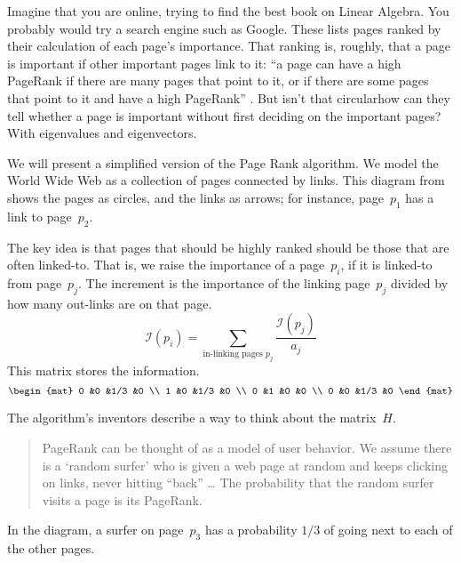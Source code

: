 
Imagine that you are online, trying to find the best book
on Linear Algebra.
You probably would try a search engine such as Google.
These lists pages ranked by their calculation of each 
page's importance.
That ranking is, roughly, that a page is important if other important
pages link to it: 
``a page can have a high PageRank if there are many pages that point
to it, or if there are some pages that point to it and have a high PageRank''
\cite{BrinPage}.
But isn't that circular\Dash how can they tell whether a page is
important without first deciding on the important pages?
With eigenvalues and eigenvectors.

We will present a simplified version of the Page Rank algorithm. 
We model the World Wide Web as a collection of pages connected by
links.
This diagram from \cite{Wills}
shows the pages as circles, and the links as arrows;
for instance, page~$p_1$ has a link to page~$p_2$. 

The key idea is that pages that should be highly ranked should be those that
are often linked-to.
That is, we raise the importance of a page~$p_i$,
if it is linked-to from page~$p_j$.
The increment is the importance of the linking page~$p_j$
divided by how many out-links are on that page.
\begin{equation*}
  \mathcal{I}(p_i)=\sum_{\text{in-linking pages $p_j$}}  \frac{\mathcal{I}(p_j)}{a_j}
\end{equation*}
This matrix stores the information.
\begin{equation*}
  \begin{mat}
    0   &0  &1/3  &0   \\
    1   &0  &1/3  &0   \\
    0   &1  &0    &0 \\
    0   &0  &1/3  &0
  \end{mat}
\end{equation*}

The algorithm's inventors describe a way to think about the matrix~$H$. 
\begin{quotation}
PageRank can be thought of as a model of user behavior. 
We assume there is a `random surfer' who is
given a web page at random and keeps clicking on links, 
never hitting ``back'' \ldots 
The probability that the random surfer visits a page is its PageRank.
\cite{BrinPage}
\end{quotation}
In the diagram, a surfer on page~$p_3$ has a probability $1/3$ of going 
next to each of the other pages. 

